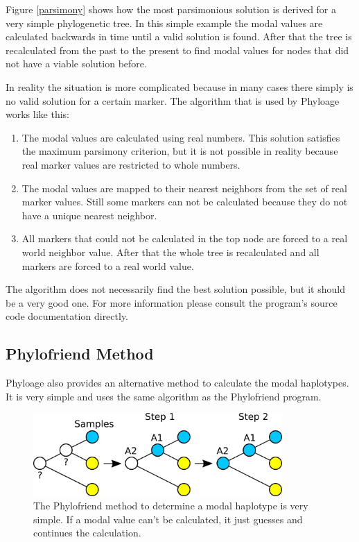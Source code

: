 Figure \ref{parsimony} shows how the most parsimonious solution
is derived for a very simple phylogenetic tree. In this simple
example the modal values are calculated backwards in time until
a valid solution is found. After that the tree is recalculated
from the past to the present to find modal values for nodes that
did not have a viable solution before.

In reality the situation is more complicated because in many
cases there simply is no valid solution for a certain marker.
The algorithm that is used by Phyloage works like this:

\begin{enumerate}
\item The modal values are calculated using real numbers.
	This solution satisfies the maximum parsimony criterion,
	but it is not possible in reality because real marker
	values are restricted to whole numbers.
\item The modal values are mapped to their nearest neighbors
	from the set of real marker values. Still some markers
	can not be calculated because they do not have a unique
	nearest neighbor.
\item All markers that could not be calculated in the top
	node are forced to a real world neighbor value. After
	that the whole tree is recalculated and all markers are
	forced to a real world value.
\end{enumerate}

The algorithm does not necessarily find the best solution
possible, but it should be a very good one. For more information
please consult the program's source code documentation
\cite{PhyloageSourceDoc} directly.


\subsection{Phylofriend Method}

Phyloage also provides an alternative method to calculate
the modal haplotypes. It is very simple and uses the same
algorithm as the Phylofriend \cite{Phylofriend} program.

\begin{figure}[ht]
\centering
\includegraphics[width=9.5cm]{img/phylofriend.png}
\caption{\label{phylofriend} The Phylofriend method to
determine a modal haplotype is very simple. If a modal
value can't be calculated, it just guesses and continues
the calculation.}
\end{figure}


